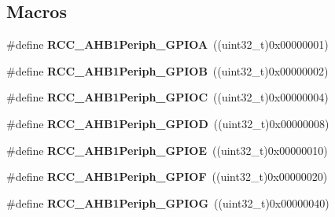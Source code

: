 \subsection*{Macros}
\begin{DoxyCompactItemize}
\item 
\mbox{\label{group___r_c_c___a_h_b1___peripherals_ga5196856bff085276016540e4c9c1dcf3}} 
\#define {\bfseries R\+C\+C\+\_\+\+A\+H\+B1\+Periph\+\_\+\+G\+P\+I\+OA}~((uint32\+\_\+t)0x00000001)
\item 
\mbox{\label{group___r_c_c___a_h_b1___peripherals_gaedb0761871ce9a0681ffdcad6ec47ea6}} 
\#define {\bfseries R\+C\+C\+\_\+\+A\+H\+B1\+Periph\+\_\+\+G\+P\+I\+OB}~((uint32\+\_\+t)0x00000002)
\item 
\mbox{\label{group___r_c_c___a_h_b1___peripherals_ga41aceda5be7d382dd5fa321f5ca5c32f}} 
\#define {\bfseries R\+C\+C\+\_\+\+A\+H\+B1\+Periph\+\_\+\+G\+P\+I\+OC}~((uint32\+\_\+t)0x00000004)
\item 
\mbox{\label{group___r_c_c___a_h_b1___peripherals_ga1d8fb07f858f198aaff77c71675f175d}} 
\#define {\bfseries R\+C\+C\+\_\+\+A\+H\+B1\+Periph\+\_\+\+G\+P\+I\+OD}~((uint32\+\_\+t)0x00000008)
\item 
\mbox{\label{group___r_c_c___a_h_b1___peripherals_gacbb8dbcf9db386727551c2f6d83a264b}} 
\#define {\bfseries R\+C\+C\+\_\+\+A\+H\+B1\+Periph\+\_\+\+G\+P\+I\+OE}~((uint32\+\_\+t)0x00000010)
\item 
\mbox{\label{group___r_c_c___a_h_b1___peripherals_ga8f2001b801c7fe584ea1f6e9ab5c3274}} 
\#define {\bfseries R\+C\+C\+\_\+\+A\+H\+B1\+Periph\+\_\+\+G\+P\+I\+OF}~((uint32\+\_\+t)0x00000020)
\item 
\mbox{\label{group___r_c_c___a_h_b1___peripherals_ga3e0023a2f4f4cc853c97868e317e9d29}} 
\#define {\bfseries R\+C\+C\+\_\+\+A\+H\+B1\+Periph\+\_\+\+G\+P\+I\+OG}~((uint32\+\_\+t)0x00000040)
\item 
\mbox{\label{group___r_c_c___a_h_b1___peripherals_ga073b5753f347cab954917b6952fcc2bf}} 

\end{DoxyCompactItemize}
